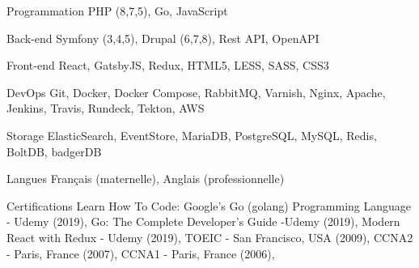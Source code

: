 

\begin{cvskills}

  \cvskill
    {Programmation} %
    {PHP (8,7,5), Go, JavaScript} %

  \cvskill
    {Back-end} %
    {Symfony (3,4,5), Drupal (6,7,8), Rest API, OpenAPI} %

  \cvskill
    {Front-end} %
    {React, GatsbyJS, Redux, HTML5, LESS, SASS, CSS3} %

  \cvskill
    {DevOps} %
    {Git, Docker, Docker Compose, RabbitMQ, Varnish, Nginx, Apache, Jenkins, Travis, Rundeck, Tekton, AWS} %

  \cvskill
    {Storage} %
    {ElasticSearch, EventStore, MariaDB, PostgreSQL, MySQL, Redis, BoltDB, badgerDB} %

  \cvskill
    {Langues} %
    {Français (maternelle), Anglais (professionnelle)} %

  \cvskill
  {Certifications} %
  {
  Learn How To Code: Google’s Go (golang) Programming Language - Udemy (2019),
  Go: The Complete Developer’s Guide -Udemy (2019),
  Modern React with Redux - Udemy (2019),
  TOEIC - San Francisco, USA (2009),
  CCNA2 - Paris, France (2007),
  CCNA1 - Paris, France (2006),
  } %

\end{cvskills}
